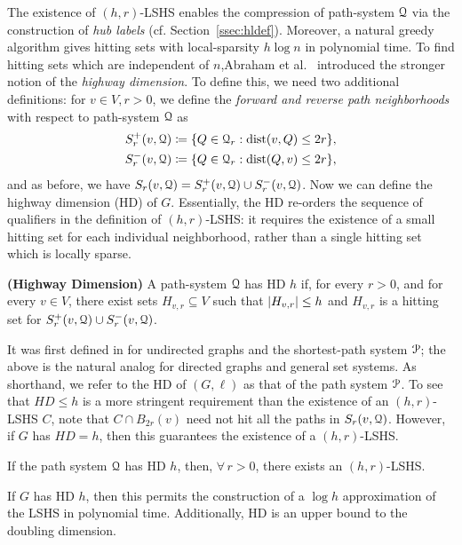 The existence of $(h,r)$-LSHS enables the compression of path-system $\mathcal{Q}$ via the construction of \emph{hub labels} (cf. Section~\ref{ssec:hldef}). Moreover, a natural greedy algorithm gives hitting sets with local-sparsity $h\log n$ in polynomial time. To find hitting sets which are independent of $n$,Abraham et al.~\citep{highway2013} introduced the stronger notion of the \emph{highway dimension}. To define this, we need two additional definitions:
for $v\in V, r>0$, we define the \emph{forward and reverse path neighborhoods} with respect to path-system $\mathcal{Q}$ as 
\begin{align*}
S_r^+(v,\mathcal{Q}) &\coloneqq\{Q\in\mathcal{Q}_r: \mbox{dist}(v,Q)\leq 2r \}, \\  
S_r^-(v,\mathcal{Q}) &\coloneqq\{Q\in\mathcal{Q}_r: \mbox{dist}(Q,v)\leq 2r \},
\end{align*}
and as before, we have $S_r(v,\mathcal{Q}) = S_r^+(v,\mathcal{Q})\cup S_r^-(v,\mathcal{Q})$. Now we can define the highway dimension (HD) of $G$. Essentially, the HD re-orders the sequence of qualifiers in the definition of $(h,r)$-LSHS: it requires the existence of a small hitting set for each individual neighborhood, rather than a single hitting set which is locally sparse. 
\begin{definition}
\label{def:hddef}
\textbf{(Highway Dimension)}
A path-system $\mathcal{Q}$ has HD $h$ if, for every $r>0$, and for every $v\in V$, there exist sets $H_{v,r}\subseteq V$ such that $\lvert H_{v,r}\rvert\leq h$ and $H_{v,r}$ is a hitting set for $S_r^+(v,\mathcal{Q})\cup S_r^-(v,\mathcal{Q})$.
\end{definition}
It was first defined in \citet{highway2013} for undirected graphs and the shortest-path system $\mathcal{P}$; the above is the natural analog for directed graphs and general set systems. 
As shorthand, we refer to the HD of $(G,\ell)$ as that of the path system $\mathcal{P}$.
To see that $HD\leq h$ is a more stringent requirement than the existence of an $(h,r)$-LSHS $C$, note that $C\cap B_{2r}(v)$ need not hit all the paths in $S_r(v,\mathcal{Q})$. 
However, if $G$ has $HD=h$, then this guarantees the existence of a $(h,r)$-LSHS.
\begin{proposition}
If the path system $\mathcal{Q}$ has HD $h$, then, $\forall\,r>0$, there exists an $(h,r)$-LSHS.
\end{proposition}


If $G$ has HD $h$, then this permits the construction of a $\log h$ approximation of the LSHS in polynomial time. Additionally, HD is an upper bound to the doubling dimension.



